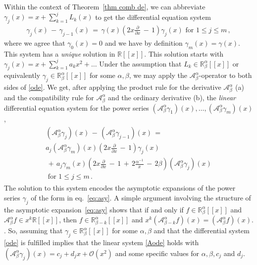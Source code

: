 \documentclass[oneside]{amsart}
\theoremstyle{definition}
\newcommand{\bigO}{\mathcal{O}}
\newcommand{\R}{{\mathbb{R}}}
\newcommand{\A}{{\mathcal{A}}}
\begin{document}
Within the context of Theorem~\ref{thm comb de}, we can abbreviate $\gamma_j(x) = x + \sum_{k=1}^j L_k(x)$ to get the differential equation system
\begin{align} \label{ode} \gamma_j(x) \,-\, \gamma_{j-1}(x) \,= \,\gamma(x) \left( 2 x \frac{\partial}{\partial x} \,-\,1 \right) \gamma_j(x) \text{ for } 1 \leq j \leq m\,, \end{align}
where we agree that $\gamma_0(x) = 0$ and we have by definition $\gamma_m(x) = \gamma(x)$.
This system has a \emph{unique} solution in $\R[[x]]$. This solution starts with $\gamma_j(x) = x + \sum_{k=1}^j a_k x^2 + \ldots$
Under the assumption  that $L_k \in \R^\alpha_\beta[[x]]$ or equivalently $\gamma_j \in \R^\alpha_\beta[[x]]$ for some $\alpha,\beta$, we may apply the $\A^\alpha_\beta$-operator to both sides of \eqref{ode}.
We get, after applying the product rule for the derivative $\A^\alpha_\beta$ (a) and the compatibility rule for $\A^\alpha_\beta$ and the ordinary derivative (b), the \emph{linear} differential equation system for the power series $(\A^\alpha_\beta \gamma_1)(x), \ldots, (\A^\alpha_\beta \gamma_m)(x)$,
\begin{gather} \begin{gathered} \label{Aode} (\A^\alpha_\beta \gamma_j)(x) \,-\, (\A^\alpha_\beta \gamma_{j-1})(x) \,= \\
a_j (\A^\alpha_\beta \gamma_m) (x) \left( 2 x \frac{\partial}{\partial x} \,-\,1 \right) \gamma_j(x) \\\,+\, a_j \gamma_m(x) \left( 2 x \frac{\partial}{\partial x} \,-\,1 \,+\, 2 \frac{\alpha^{-1}}{x} \,-\, 2 \beta \right) (\A^\alpha_\beta \gamma_j)(x) \\
\text{ for } 1 \leq j \leq m\,. \end{gathered} \end{gather}
The solution to this system encodes the asymptotic expansions of the power series $\gamma_j$ of the form in eq.~\eqref{eq:asy}.
A simple argument involving the structure of the asymptotic expansion~\eqref{eq:asy}
shows that if and only if $f \in \R^\alpha_\beta[[x]]$ and $\A^\alpha_\beta f \in x^k \R[[x]]$, then $f \in \R^\alpha_{\beta-k}[[x]]$
and $x^k(\A^\alpha_{\beta-k} f)(x) = (\A^\alpha_{\beta} f)(x)$.
\cite[Proposition 14]{Bgenfun}.
So, assuming that $\gamma_j \in \R^\alpha_\beta[[x]]$ for some $\alpha,\beta$ and that the differential system \eqref{ode} is fulfilled 
implies that the linear system \eqref{Aode} holds with  
$(\A^\alpha_\beta \gamma_j)(x) = c_j + d_j x + \bigO(x^2)$ and some specific values for $\alpha,\beta,c_j$ and $d_j$.
\end{document}
